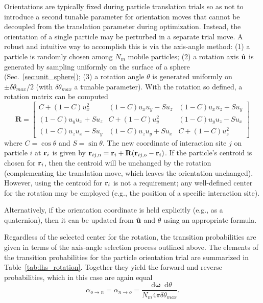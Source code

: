 \documentclass[
  9pt,
  bestpractices,
]{livecoms}
\newcommand*\diff{\mathop{}\!\mathrm{d}}
\begin{document}
Orientations are typically fixed during particle translation trials so as not to introduce a second tunable parameter for orientation moves that cannot be decoupled from the translation parameter during optimization.
Instead, the orientation of a single particle may be perturbed in a separate trial move.
A robust and intuitive way to accomplish this is via the axis-angle method: (1) a particle is randomly chosen among $N_m$ mobile particles; (2) a rotation axis $\hat {\bf u}$ is generated by sampling uniformly on the surface of a sphere (Sec.~\ref{sec:unit_sphere}); (3) a rotation angle $\theta$ is generated uniformly on $\pm\delta\theta_{max}/2$ (with $\delta\theta_{max}$ a tunable parameter).
With the rotation so defined, a rotation matrix can be computed
\begin{equation}
\mathbf{R} =
\begin{bmatrix}
C + (1 - C) u_x^2 & (1 - C) u_x u_y - S u_z & (1 - C) u_x u_z + S u_y \\
(1 - C) u_y u_x + S u_z & C + (1 - C) u_y^2 & (1 - C) u_y u_z - S u_x \\
(1 - C) u_z u_x - S u_y & (1 - C) u_z u_y + S u_x & C + (1 - C) u_z^2
\end{bmatrix}
\label{eq:rotation_matrix}
\end{equation}
where $C =\cos\theta$ and $S = \sin\theta$.
The new coordinate of interaction site $j$ on particle $i$ at ${\bf r}_i$ is given by ${{\bf r}_{ij,{\rm n}}={\bf r}_{i}}+{\mathbf R}({\bf r}_{ij,{\rm o}}-{\bf r}_i)$.
If the particle's centroid is chosen for ${\bf r}_i$, then the centroid will be unchanged by the rotation (complementing the translation move, which leaves the orientation unchanged).
However, using the centroid for ${\bf r}_i$ is not a requirement; any well-defined center for the rotation may be employed (e.g., the position of a specific interaction site).

Alternatively, if the orientation coordinate is held explicitly (e.g., as a quaternion), then it can be updated from $\hat{\bf u}$ and $\theta$ using an appropriate formula.

Regardless of the selected center for the rotation, the transition probabilities are given in terms of the axis-angle selection process outlined above.
The elements of the transition probabilities for the particle orientation trial are summarized in Table~\ref{tab:lhs_rotation}.
Together they yield the forward and reverse probabilities, which in this case are again equal
\begin{equation}
  \alpha_{o\rightarrow n}=\alpha_{n\rightarrow o} = \frac{\diff\mathbf{\omega}\diff\theta}{N_m 4\pi\delta\theta_{max}}.
\label{eq:lhs_rhs_rot_fwdrev}
\end{equation}
\end{document}
